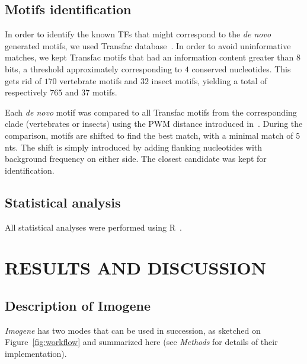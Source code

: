 \documentclass[a4,center,fleqn]{NAR}
\begin{document}
\subsection*{Motifs identification} 

In order to identify the known TFs that might correspond to the \textit{de
novo} generated motifs, we used Transfac database~\cite{Matys:2006gf}.
In order to avoid uninformative matches, we kept Transfac motifs that had an
information content greater than $8$ bits, a threshold approximately
corresponding to $4$ conserved nucleotides.
This gets rid of $170$ vertebrate motifs and $32$ insect motifs, yielding
a total of respectively $765$ and $37$ motifs.
 
Each \textit{de novo} motif was compared to all Transfac motifs from the
corresponding clade (vertebrates or insects) using the PWM distance introduced
in~\cite{Rouault:2010fk}.
During the comparison, motifs are shifted to find the best match, with
a minimal match of $5$ nts.
The shift is simply introduced by adding flanking nucleotides with background
frequency on either side.
The closest candidate was kept for identification.


\subsection*{Statistical analysis}

All statistical analyses were performed using R~\cite{Rstat}.

\section{RESULTS AND DISCUSSION}

\subsection*{Description of Imogene}
\label{imdesc}



\textit{Imogene} has two modes that can be used in succession, as sketched on
Figure~\ref{fig:workflow}  and summarized here (see {\em Methods} for details
of their implementation).
\end{document}

